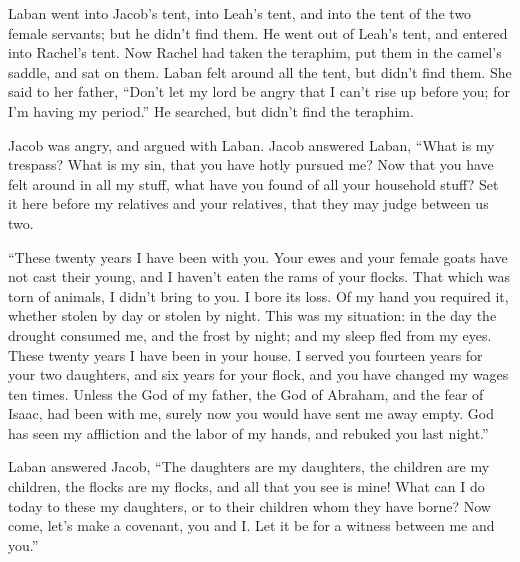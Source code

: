  Laban went into Jacob's tent, into Leah's tent, and into
the tent of the two female servants; but he didn't find them. He went
out of Leah's tent, and entered into Rachel's tent.  Now
Rachel had taken the teraphim, put them in the camel's saddle, and sat
on them. Laban felt around all the tent, but didn't find them.
 She said to her father, ``Don't let my lord be angry
that I can't rise up before you; for I'm having my period.'' He
searched, but didn't find the teraphim.

 Jacob was angry, and argued with Laban. Jacob answered
Laban, ``What is my trespass? What is my sin, that you have hotly
pursued me?  Now that you have felt around in all my
stuff, what have you found of all your household stuff? Set it here
before my relatives and your relatives, that they may judge between us
two.

 ``These twenty years I have been with you. Your ewes and
your female goats have not cast their young, and I haven't eaten the
rams of your flocks.  That which was torn of animals, I
didn't bring to you. I bore its loss. Of my hand you required it,
whether stolen by day or stolen by night.  This was my
situation: in the day the drought consumed me, and the frost by night;
and my sleep fled from my eyes.  These twenty years I
have been in your house. I served you fourteen years for your two
daughters, and six years for your flock, and you have changed my wages
ten times.  Unless the God of my father, the God of
Abraham, and the fear of Isaac, had been with me, surely now you would
have sent me away empty. God has seen my affliction and the labor of my
hands, and rebuked you last night.''

 Laban answered Jacob, ``The daughters are my daughters,
the children are my children, the flocks are my flocks, and all that you
see is mine! What can I do today to these my daughters, or to their
children whom they have borne?  Now come, let's make a
covenant, you and I. Let it be for a witness between me and you.''

